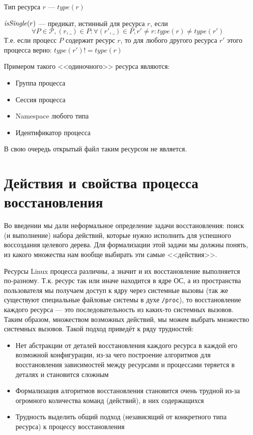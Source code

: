 \begin{defn}
Тип ресурса $r$ --- $type(r)$
\end{defn}

\begin{defn}
\label{def:singleResource}
$\text{\textit{isSingle}}(r)$ --- предикат, истинный для ресурса $r$, если 
\begin{equation*}
\forall P \in \mathcal{P}, (r, \_) \in P: \forall (r', \_) \in P, r' \neq r: type(r) \neq type(r')
\end{equation*}
Т.е. если процесс $P$ содержит ресурс $r$, то для любого другого ресурса $r'$ этого процесса верно: $type(r') != type(r)$
\end{defn}

\begin{exmp}
Примером такого <<одиночного>> ресурса являются:
\begin{itemize}
	\item Группа процесса
	\item Сессия процесса
	\item Namespace любого типа
	\item Идентификатор процесса
\end{itemize}
В свою очередь открытый файл таким ресурсом не является.
\end{exmp}

\section{Действия и свойства процесса восстановления}

Во введении мы дали неформальное определение задачи восстановления: поиск (и выполнение) набора действий, которые нужно исполнить для успешного воссоздания целевого дерева. Для формализации этой задачи мы должны понять, из какого множества нам вообще выбирать эти самые <<действия>>.

Ресурсы Linux процесса различны, а значит и их восстановление выполняется по-разному. Т.к. ресурс так или иначе находится в ядре ОС, а из пространства пользователя мы получаем доступ к ядру через системные вызовы (так же существуют специальные файловые системы в духе \texttt{/proc}), то восстановление каждого ресурса --- это последовательность из каких-то системных вызовов. Таким образом, множеством возможных действий, мы можем выбрать множество системных вызовов. Такой подход приведёт к ряду трудностей:
\begin{itemize}
	\item Нет абстракции от деталей восстановления каждого ресурса в каждой его возможной конфигурации, из-за чего построение алгоритмов для восстановления зависимостей между ресурсами и процессами теряется в деталях и становится сложным
	\item Формализация алгоритмов восстановления становится очень трудной из-за огромного количества команд (действий), в них содержащихся
	\item Трудность выделить общий подход (независящий от конкретного типа ресурса) к процессу восстановления
\end{itemize}

